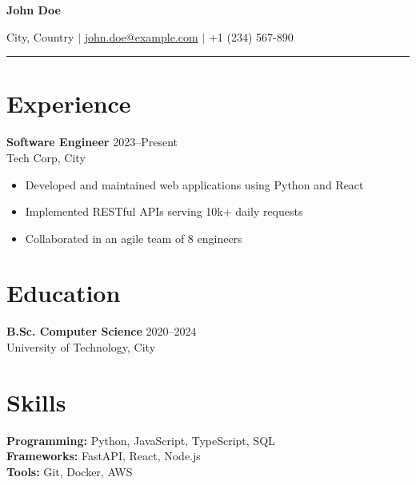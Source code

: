 \documentclass[11pt,a4paper]{article}
\begin{document}
{\LARGE\bfseries John Doe}

\vspace{4pt}
City, Country $\vert$ \href{mailto:john.doe@example.com}{john.doe@example.com} $\vert$ +1 (234) 567-890

\vspace{12pt}
\hrule
\vspace{12pt}

\section*{Experience}

\textbf{Software Engineer} \hfill 2023--Present\\
Tech Corp, City
\begin{itemize}[leftmargin=1.5em]
    \item Developed and maintained web applications using Python and React
    \item Implemented RESTful APIs serving 10k+ daily requests
    \item Collaborated in an agile team of 8 engineers
\end{itemize}

\section*{Education}

\textbf{B.Sc. Computer Science} \hfill 2020--2024\\
University of Technology, City

\section*{Skills}

\textbf{Programming:} Python, JavaScript, TypeScript, SQL\\
\textbf{Frameworks:} FastAPI, React, Node.js\\
\textbf{Tools:} Git, Docker, AWS
\end{document}
